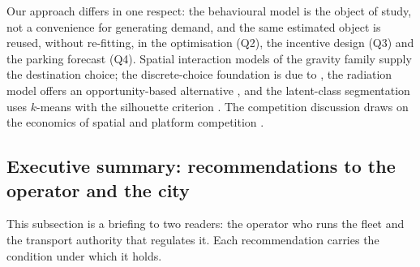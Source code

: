 Our approach differs in one respect: the behavioural model is the object of study,
not a convenience for generating demand, and the same estimated object is reused,
without re-fitting, in the optimisation (Q2), the incentive design (Q3) and the parking
forecast (Q4). Spatial interaction models of the gravity family
\cite{wilson1970,erlander1990,fotheringham1989} supply the destination choice; the
discrete-choice foundation is due to \cite{mcfadden1974}, the radiation model offers
an opportunity-based alternative \cite{simini2012}, and the latent-class segmentation
uses $k$-means \cite{lloyd1982} with the silhouette criterion \cite{rousseeuw1987}.
The competition discussion draws on the economics of spatial and platform competition
\cite{hotelling1929,katz1985,rochet2003}.

\subsection{Executive summary: recommendations to the operator and the city}

This subsection is a briefing to two readers: the operator who runs the fleet and the
transport authority that regulates it. Each recommendation carries the condition
under which it holds.

